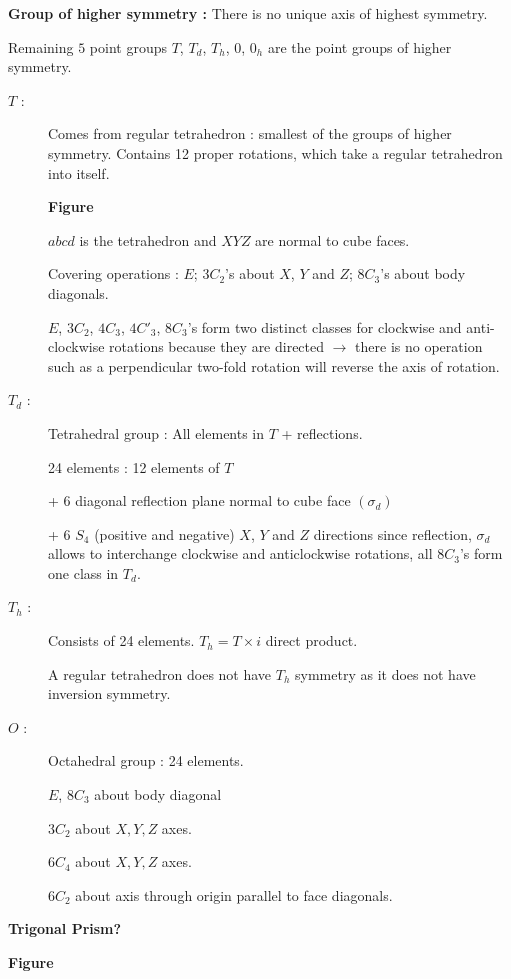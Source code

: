 \noindent
{\bf Group of higher symmetry :} There is no unique axis of highest symmetry.

Remaining $5$ point groups $T$, $T_{d}$, $T_{h}$, $0$, $0_{h}$ are the point groups of higher symmetry.
\begin{description}
\item[$T$ :] Comes from regular tetrahedron : smallest of the groups of higher symmetry. Contains 12 proper rotations, which take a regular tetrahedron into itself.
\begin{center}
{\bf Figure}
\end{center}
$abcd$ is the tetrahedron and $XYZ$ are normal to cube faces.

Covering operations : $E$; $3C_{2}$'s about $X$, $Y$ and $Z$; $8C_{3}$'s about body diagonals.

$E$, $3C_{2}$, $4C_{3}$, $4C'_{3}$, $8C_{3}$'s form two distinct classes for clockwise and anti-clockwise rotations because they are directed $\to$ there is no operation such as a perpendicular two-fold rotation will reverse the axis of rotation.

\item[$T_{d}$ :] Tetrahedral group : All elements in $T$ + reflections.

24 elements : 12 elements of $T$

+ 6 diagonal reflection plane normal to cube face $(\sigma_{d})$

+ 6 $S_{4}$ (positive and negative) $X$, $Y$ and $Z$ directions since reflection, $\sigma_{d}$ allows to interchange clockwise and anticlockwise rotations, all $8C_{3}$'s form one class in $T_{d}$. 

\item[$T_{h}$ :] Consists of 24 elements. $T_{h}=T\times i$ direct product.

A regular tetrahedron does not have $T_{h}$ symmetry as it does not have inversion symmetry.

\item[$O$ :] Octahedral group : 24 elements.

$E$, $8C_{3}$ about body diagonal

$3C_{2}$ about $X, Y, Z$ axes.

$6C_{4}$ about $X, Y, Z$ axes.

$6C_{2}$ about axis through origin parallel to face diagonals.
\end{description}

\noindent
{\bf Trigonal Prism?}
\begin{center}
{\bf Figure}
\end{center}

